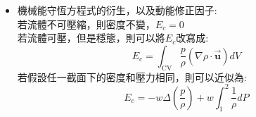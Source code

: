 \documentclass[../main.tex]{subfiles}
\begin{document}
\begin{itemize}
\begin{itemize}
\begin{align}
        \frac{d}{dt}\left(
          K_{\text{tot}} + \bm \Phi_{\text{tot}}
        \right) =&\left[ \left(
          \frac{1}{2}\rho_1\left<u_1^3\right> + \rho_1\hat{\bm \Phi}_1 \left<u_1\right> + P_1 \left<u_1\right>
        \right) S_1 \right]\nonumber\\
        & - \left[\left(
          \frac{1}{2}\rho_2\left<u_2^3\right> + \rho_2\hat{\bm \Phi}_2 \left<u_2\right> + P_2 \left<u_2\right>
        \right) S_2 \right] \nonumber \\
        & + W_m + E_c + E_v
      \end{align}
      若假設Steady State，且控制體積內的位能不變，則左邊為0\\
      並且將位能改寫成高度$h$的形式:
      \begin{equation}
        \hat{\bm \Phi} = gh
      \end{equation}
      則得到:
      \begin{align}
        0 =& \left[ \left(
          \frac{1}{2}\rho_1\left<u_1^3\right> + \rho_1 gh_1 \left<u_1\right> + P_1 \left<u_1\right>
        \right) S_1 \right] \nonumber \\
        & - \left[\left(
          \frac{1}{2}\rho_2\left<u_2^3\right> + \rho_2 gh_2 \left<u_2\right> + P_2 \left<u_2\right>
        \right) S_2 \right] \nonumber \\
        & + W_m + E_c + E_v
      \end{align}
      將上式除以$w$，並整理，得到機械能守恆方程式:
      \begin{equation}
        \frac{1}{2}\left(\frac{\left<u_2^3\right>}{\left<u_2\right>} - 
        \frac{\left<u_1^3\right>}{\left<u_1\right>}\right) + g(h_2 - h_1) 
        + \left(\frac{P_2}{\rho_2} - \frac{P_1}{\rho_1}\right) 
        = \frac{-W_m + E_c + E_v}{w}
      \end{equation}
    \item 機械能守恆方程式的衍生，以及動能修正因子:\\
      若流體不可壓縮，則密度不變，$E_c =0$\\
      若流體可壓，但是穩態，則可以將$E_c$改寫成:
      \begin{equation}
        E_c = \int_{\text{CV}} \frac{p}{\rho} (\nabla \rho \cdot \vec{\bm u}) dV
      \end{equation}
      若假設任一截面下的密度和壓力相同，則可以近似為:
      \begin{equation}
        E_c = -w\Delta \left(\frac{p}{\rho}\right) + w\int_1^2\frac{1}{\rho} dP 
      \end{equation}

\end{itemize}
\end{itemize}
\end{document}
